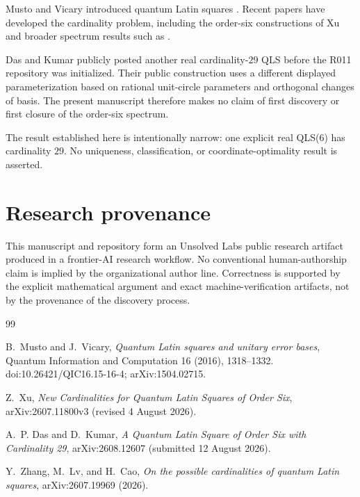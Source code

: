 \documentclass[11pt]{article}
\theoremstyle{definition}
\theoremstyle{plain}
\begin{document}
Musto and Vicary introduced quantum Latin squares \cite{MustoVicary2016}.
Recent papers have developed the cardinality problem, including the order-six constructions of Xu \cite{Xu2026} and broader spectrum results such as \cite{ZhangLvCao2026}.

Das and Kumar \cite{DasKumar2026} publicly posted another real cardinality-\(29\) QLS before the R011 repository was initialized.
Their public construction uses a different displayed parameterization based on rational unit-circle parameters and orthogonal changes of basis.
The present manuscript therefore makes no claim of first discovery or first closure of the order-six spectrum.

The result established here is intentionally narrow:
one explicit real QLS(6) has cardinality \(29\).
No uniqueness, classification, or coordinate-optimality result is asserted.

\section*{Research provenance}

This manuscript and repository form an Unsolved Labs public research artifact produced in a frontier-AI research workflow.
No conventional human-authorship claim is implied by the organizational author line.
Correctness is supported by the explicit mathematical argument and exact machine-verification artifacts, not by the provenance of the discovery process.

\begin{thebibliography}{99}

B.~Musto and J.~Vicary,
\emph{Quantum Latin squares and unitary error bases},
Quantum Information and Computation 16 (2016), 1318--1332.
doi:10.26421/QIC16.15-16-4; arXiv:1504.02715.

Z.~Xu,
\emph{New Cardinalities for Quantum Latin Squares of Order Six},
arXiv:2607.11800v3 (revised 4 August 2026).

A.~P. Das and D.~Kumar,
\emph{A Quantum Latin Square of Order Six with Cardinality 29},
arXiv:2608.12607 (submitted 12 August 2026).

Y.~Zhang, M.~Lv, and H.~Cao,
\emph{On the possible cardinalities of quantum Latin squares},
arXiv:2607.19969 (2026).

\end{thebibliography}
\end{document}
